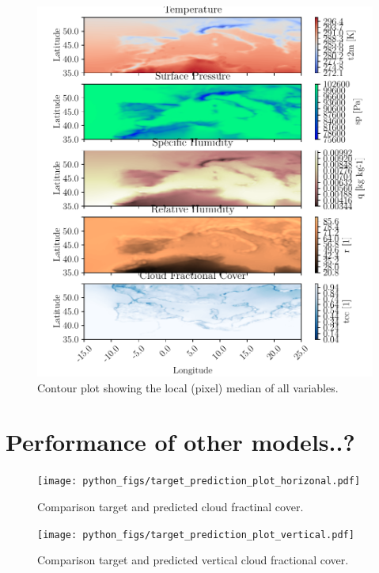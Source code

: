\begin{figure}[ht]
    \centering
    \includegraphics{python_figs/contourplot_all_variables_median.pdf}
    \caption{Contour plot showing the local (pixel) median of all variables.}
    \label{fig:contour_mean_all_vars}
\end{figure}




\cleardoublepage

\chapter{Performance of other models..?}

\begin{figure}[ht]
    \centering
    \texttt{[image: python\_figs/target\_prediction\_plot\_horizonal.pdf]}
    \caption{Comparison target and predicted cloud fractinal cover.}
    \label{fig:target_predict_horizontal}
\end{figure}

\begin{figure}[ht]
    \centering
    \texttt{[image: python\_figs/target\_prediction\_plot\_vertical.pdf]}
    \caption{Comparison target and predicted vertical cloud fractional cover.}
    \label{fig:target_predict_vertical}
\end{figure}

